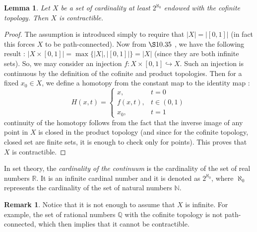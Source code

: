 \documentclass{article}
\theoremstyle{plain}
\newtheorem{lemma}[theorem]{Lemma}
\theoremstyle{definition}
\newtheorem{remark}{Remark}
\begin{document}
\begin{lemma}
    Let $X$ be a set of cardinality at least $2^{\aleph_0}$ endowed with the cofinite topology.
    Then $X$ is contractible.
\end{lemma}
\begin{proof}
    The assumption is introduced simply to require that $\lvert X \rvert = \lvert [0,1]\rvert$ (in fact this forces $X$ to be path-connected).
    Now from \cite{set_theory} $\S 10.35$ , we have the following result : $\lvert X\times [0,1]\rvert = \max\{\lvert X\rvert , \lvert [0,1]\rvert \} = \lvert X\rvert$ (since they are both infinite sets).
    So, we may consider an injection $f:X\times [0,1] \hookrightarrow X$.
    Such an injection is continuous by the definition of the cofinite and product topologies. 
    Then for a fixed $x_0\in X$, we define a homotopy from the constant map to the identity map :
    \begin{equation*}
    H(x,t)=
    \begin{cases}
        x, & t=0\\
        f(x,t), & t\in (0,1)\\
        x_0, & t=1
    \end{cases}
    \end{equation*}
    continuity of the homotopy follows from the fact that the inverse image of any point in $X$ is closed in the product topology (and since for the cofinite topology, closed set are finite sets, it is enough to check only for points). 
    This proves that $X$ is contractible.
\end{proof}

\noindent In set theory, the \textit{cardinality of the continuum} is the cardinality of the set of real numbers $\mathbb{R}$.
It is an infinite cardinal number and it is denoted as $2^{\aleph_0}$, where $\aleph_0$ represents the cardinality of the set of natural numbers $\mathbb{N}$.

\begin{remark}
    Notice that it is not enough to assume that $X$ is infinite.
    For example, the set of rational numbers $\mathbb{Q}$ with the cofinite topology is not path-connected, which then implies that it cannot be contractible.
\end{remark}
\end{document}
